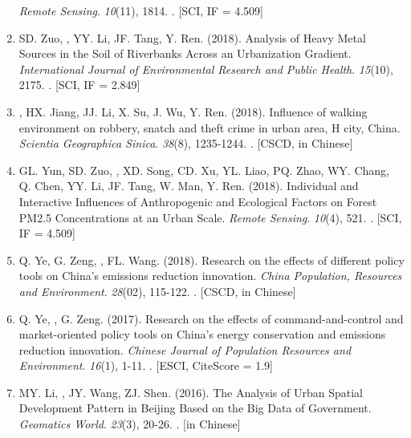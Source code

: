 \begin{enumerate}
    \textit{Remote Sensing}. \textit{10}(11), 1814.
    . [SCI, IF = 4.509]
\item
    SD. Zuo, \Shaoqing, YY. Li, JF. Tang, Y. Ren. (2018).
	Analysis of Heavy Metal Sources in the Soil of Riverbanks Across an Urbanization Gradient.
    \textit{International Journal of Environmental Research and Public Health}. \textit{15}(10), 2175.
    . [SCI, IF = 2.849]
\item
    \Shaoqing, HX. Jiang, JJ. Li, X. Su, J. Wu, Y. Ren. (2018).
	Influence of walking environment on robbery, snatch and theft crime in urban area, H city, China.
    \textit{Scientia Geographica Sinica}.  \textit{38}(8), 1235-1244.
    . [CSCD, in Chinese]
\item
    GL. Yun, SD. Zuo, \Shaoqing, XD. Song, CD. Xu, YL. Liao, PQ. Zhao, WY. Chang, Q. Chen, YY. Li, JF. Tang, W. Man, Y. Ren. (2018).
	Individual and Interactive Influences of Anthropogenic and Ecological Factors on Forest PM2.5 Concentrations at an Urban Scale.
    \textit{Remote Sensing}. \textit{10}(4), 521.
    . [SCI, IF = 4.509]
\item
    Q. Ye, G. Zeng, \Shaoqing, FL. Wang. (2018).
	Research on the effects of different policy tools on China’s emissions reduction innovation.
    \textit{China Population, Resources and Environment}. \textit{28}(02), 115-122.
    . [CSCD, in Chinese]
\item
    Q. Ye, \Shaoqing, G. Zeng. (2017).
	Research on the effects of command-and-control and market-oriented policy tools on China’s energy conservation and emissions reduction innovation.
    \textit{Chinese Journal of Population Resources and Environment}. \textit{16}(1), 1-11.
    . [ESCI, CiteScore = 1.9]
\item
    MY. Li, \Shaoqing, JY. Wang, ZJ. Shen. (2016).
	The Analysis of Urban Spatial Development Pattern in Beijing Based on the Big Data of Government.
    \textit{Geomatics World}. \textit{23}(3), 20-26.
    . [in Chinese]
\end{enumerate}

